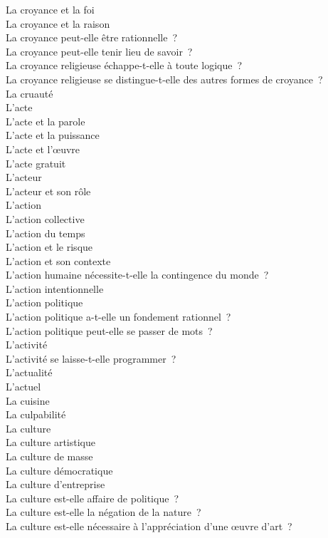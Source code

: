 \documentclass[a4paper,12pt]{article}
\begin{document}
La croyance et la foi \\
La croyance et la raison \\
La croyance peut-elle être rationnelle ? \\
La croyance peut-elle tenir lieu de savoir ? \\
La croyance religieuse échappe-t-elle à toute logique ? \\
La croyance religieuse se distingue-t-elle des autres formes de croyance ? \\
La cruauté \\
L'acte \\
L'acte et la parole \\
L'acte et la puissance \\
L'acte et l'œuvre \\
L'acte gratuit \\
L'acteur \\
L'acteur et son rôle \\
L'action \\
L'action collective \\
L'action du temps \\
L'action et le risque \\
L'action et son contexte \\
L'action humaine nécessite-t-elle la contingence du monde ? \\
L'action intentionnelle \\
L'action politique \\
L'action politique a-t-elle un fondement rationnel ? \\
L'action politique peut-elle se passer de mots ? \\
L'activité \\
L'activité se laisse-t-elle programmer ? \\
L'actualité \\
L'actuel \\
La cuisine \\
La culpabilité \\
La culture \\
La culture artistique \\
La culture de masse \\
La culture démocratique \\
La culture d'entreprise \\
La culture est-elle affaire de politique ? \\
La culture est-elle la négation de la nature ? \\
La culture est-elle nécessaire à l'appréciation d'une œuvre d'art ? \\
\end{document}
